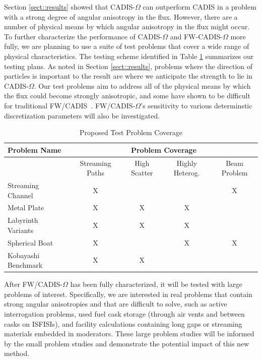 \documentclass[12pt]{article}
\begin{document}
Section \ref{sect::results} showed that CADIS-$\Omega$ can outperform CADIS in a problem with a strong degree of angular anisotropy in the flux. However, there are a number of physical means by which angular anisotropy in the flux might occur. To further characterize the performance of CADIS-$\Omega$ and FW-CADIS-$\Omega$ more fully, we are planning to use a suite of test problems that cover a wide range of physical characteristics. The testing scheme identified in Table \ref{tab:testprobs} summarizes our testing plans. As noted in Section \ref{sect::results}, problems where the direction of particles is important to the result are where we anticipate the strength to lie in CADIS-$\Omega$. Our test problems aim to address all of the physical means by which the flux could become strongly anisotropic, and some have shown to be difficult for traditional FW/CADIS~\cite{peplow_consistent_2012}. FW/CADIS-$\Omega$'s sensitivity to various determinstic discretization parameters will also be investigated. 

 \begin{table}
  \centering
  \caption{Proposed Test Problem Coverage}
  \begin{tabular}{l|cccc}
    \toprule
    Problem Name & \multicolumn{4}{c}{Problem Coverage} \\
    \hline
     & Streaming Paths & High Scatter & Highly Heterog. & Beam Problem \\
    \hline
    Streaming Channel   & X & & & X \\ 
    Metal Plate         & X & X & X &  \\
    Labyrinth Variants  & X & X & X &  \\ 
    Spherical Boat      & X & & X & X \\  
    Kobayashi Benchmark & X & X &  &  \\   
	\bottomrule
  \end{tabular}
  \label{tab:testprobs}
\end{table}

After FW/CADIS-$\Omega$ has been fully characterized, it will be tested with large problems of interest. 
Specifically, we are interested in real problems that contain strong angular anisotropies and that are difficult to solve, such as active interrogation problems, used fuel cask storage (through air vents and between casks on ISFISIs), and facility calculations containing long gaps or streaming materials embedded in moderators. 
These large problem studies will be informed by the small problem studies and demonstrate the potential impact of this new method. 
\end{document}
